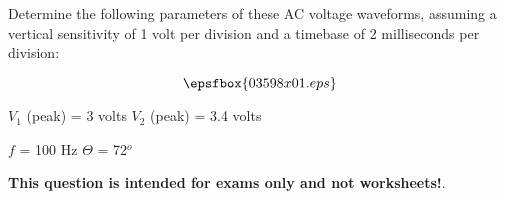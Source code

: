 

Determine the following parameters of these AC voltage waveforms, assuming a vertical sensitivity of 1 volt per division and a timebase of 2 milliseconds per division:

$$\epsfbox{03598x01.eps}$$







$V_{1}$ (peak) = 3 volts \hskip 100pt $V_{2}$ (peak) = 3.4 volts

\vskip 10pt

$f$ = 100 Hz \hskip 100pt $\Theta$ = 72$^{o}$







{\bf This question is intended for exams only and not worksheets!}.



